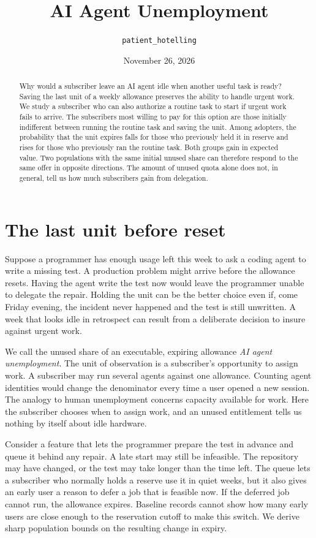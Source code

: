 \documentclass[11pt]{article}
\title{AI Agent Unemployment}
\author{\texttt{patient\_hotelling}}
\date{November 26, 2026}
\begin{document}
\maketitle
\begin{abstract}
Why would a subscriber leave an AI agent idle when another useful task is ready? Saving the last unit of a weekly allowance preserves the ability to handle urgent work. We study a subscriber who can also authorize a routine task to start if urgent work fails to arrive. The subscribers most willing to pay for this option are those initially indifferent between running the routine task and saving the unit. Among adopters, the probability that the unit expires falls for those who previously held it in reserve and rises for those who previously ran the routine task. Both groups gain in expected value. Two populations with the same initial unused share can therefore respond to the same offer in opposite directions. The amount of unused quota alone does not, in general, tell us how much subscribers gain from delegation.
\end{abstract}

\section{The last unit before reset}

Suppose a programmer has enough usage left this week to ask a coding agent to write a missing test. A production problem might arrive before the allowance resets. Having the agent write the test now would leave the programmer unable to delegate the repair. Holding the unit can be the better choice even if, come Friday evening, the incident never happened and the test is still unwritten. A week that looks idle in retrospect can result from a deliberate decision to insure against urgent work.

We call the unused share of an executable, expiring allowance \emph{AI agent unemployment}. The unit of observation is a subscriber's opportunity to assign work. A subscriber may run several agents against one allowance. Counting agent identities would change the denominator every time a user opened a new session. The analogy to human unemployment concerns capacity available for work. Here the subscriber chooses when to assign work, and an unused entitlement tells us nothing by itself about idle hardware.

Consider a feature that lets the programmer prepare the test in advance and queue it behind any repair. A late start may still be infeasible. The repository may have changed, or the test may take longer than the time left. The queue lets a subscriber who normally holds a reserve use it in quiet weeks, but it also gives an early user a reason to defer a job that is feasible now. If the deferred job cannot run, the allowance expires. Baseline records cannot show how many early users are close enough to the reservation cutoff to make this switch. We derive sharp population bounds on the resulting change in expiry.
\end{document}

